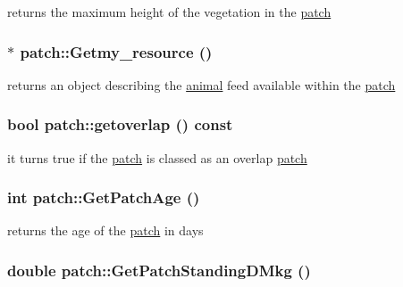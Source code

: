 returns the maximum height of the vegetation in the \hyperlink{classpatch}{patch} \hypertarget{classpatch_a81ef82ba67a54c62690a8b3139a2e3a8}{
\subsubsection[{Getmy\_\-resource}]{$\ast$ patch::Getmy\_\-resource ()}}
\label{classpatch_a81ef82ba67a54c62690a8b3139a2e3a8}


returns an object describing the \hyperlink{classanimal}{animal} feed available within the \hyperlink{classpatch}{patch} \hypertarget{classpatch_aeb73d687a6349a34695f19b4613008eb}{
\subsubsection[{getoverlap}]{\setlength{\rightskip}{0pt plus 5cm}bool patch::getoverlap () const}}
\label{classpatch_aeb73d687a6349a34695f19b4613008eb}


it turns true if the \hyperlink{classpatch}{patch} is classed as an overlap \hyperlink{classpatch}{patch} \hypertarget{classpatch_af7300152fc005aa7b51ff74ec3824197}{
\subsubsection[{GetPatchAge}]{\setlength{\rightskip}{0pt plus 5cm}int patch::GetPatchAge ()}}
\label{classpatch_af7300152fc005aa7b51ff74ec3824197}


returns the age of the \hyperlink{classpatch}{patch} in days \hypertarget{classpatch_a9e9681c8b32bc2638268b3eb9f230772}{
\subsubsection[{GetPatchStandingDMkg}]{\setlength{\rightskip}{0pt plus 5cm}double patch::GetPatchStandingDMkg ()}}
\label{classpatch_a9e9681c8b32bc2638268b3eb9f230772}


